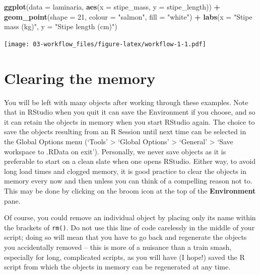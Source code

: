 \documentclass[]{book}
\newenvironment{Shaded}{\begin{snugshade}}{\end{snugshade}}
\newcommand{\KeywordTok}[1]{\textcolor[rgb]{0.13,0.29,0.53}{\textbf{#1}}}
\newcommand{\DataTypeTok}[1]{\textcolor[rgb]{0.13,0.29,0.53}{#1}}
\newcommand{\DecValTok}[1]{\textcolor[rgb]{0.00,0.00,0.81}{#1}}
\newcommand{\StringTok}[1]{\textcolor[rgb]{0.31,0.60,0.02}{#1}}
\newcommand{\OperatorTok}[1]{\textcolor[rgb]{0.81,0.36,0.00}{\textbf{#1}}}
\newcommand{\NormalTok}[1]{#1}
\theoremstyle{definition}
\theoremstyle{definition}
\theoremstyle{definition}
\theoremstyle{remark}
\begin{document}
\begin{Shaded}
\begin{Highlighting}[]
\KeywordTok{ggplot}\NormalTok{(}\DataTypeTok{data =}\NormalTok{ laminaria, }\KeywordTok{aes}\NormalTok{(}\DataTypeTok{x =}\NormalTok{ stipe_mass, }\DataTypeTok{y =}\NormalTok{ stipe_length)) }\OperatorTok{+}
\StringTok{  }\KeywordTok{geom_point}\NormalTok{(}\DataTypeTok{shape =} \DecValTok{21}\NormalTok{, }\DataTypeTok{colour =} \StringTok{"salmon"}\NormalTok{, }\DataTypeTok{fill =} \StringTok{"white"}\NormalTok{) }\OperatorTok{+}
\StringTok{  }\KeywordTok{labs}\NormalTok{(}\DataTypeTok{x =} \StringTok{"Stipe mass (kg)"}\NormalTok{, }\DataTypeTok{y =} \StringTok{"Stipe length (cm)"}\NormalTok{)}
\end{Highlighting}
\end{Shaded}

\texttt{[image: 03-workflow\_files/figure-latex/workflow-1-1.pdf]}

\section{Clearing the memory}\label{clearing-the-memory}

You will be left with many objects after working through these examples.
Note that in RStudio when you quit it can save the Environment if you
choose, and so it can retain the objects in memory when you start
RStudio again. The choice to save the objects resulting from an R
Session until next time can be selected in the Global Options menu
(`Tools' \textgreater{} `Global Options' \textgreater{} `General'
\textgreater{} `Save workspace to .RData on exit'). Personally, we never
save objects as it is preferable to start on a clean slate when one
opens RStudio. Either way, to avoid long load times and clogged memory,
it is good practice to clear the objects in memory every now and then
unless you can think of a compelling reason not to. This may be done by
clicking on the broom icon at the top of the \textbf{Environment} pane.

Of course, you could remove an individual object by placing only its
name within the brackets of \texttt{rm()}. Do not use this line of code
carelessly in the middle of your script; doing so will mean that you
have to go back and regenerate the objects you accidentally removed --
this is more of a nuisance than a train smash, especially for long,
complicated scripts, as you will have (I hope!) saved the R script from
which the objects in memory can be regenerated at any time.
\end{document}
